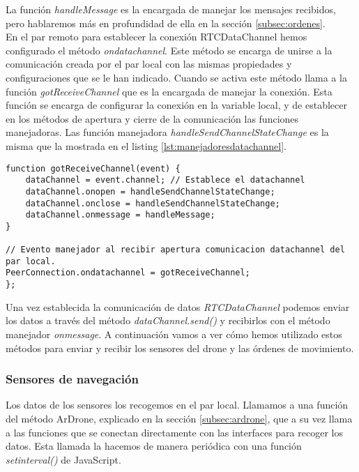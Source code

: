La función \emph{handleMessage} es la encargada de manejar los mensajes recibidos, pero hablaremos más en profundidad de ella en la sección \ref{subsec:ordenes}.\\

En el par remoto para establecer la conexión RTCDataChannel hemos configurado el método \emph{ondatachannel}. Este método se encarga de unirse a la comunicación creada por el par local con las mismas propiedades y configuraciones que se le han indicado. Cuando se activa este método llama a la función \emph{gotReceiveChannel} que es la encargada de manejar  la conexión. Esta función se encarga de configurar la conexión en la variable local, y de establecer en los métodos de apertura y cierre de la comunicación las funciones manejadoras. Las función manejadora \emph{handleSendChannelStateChange} es la misma que la mostrada en el listing \ref{lst:manejadoresdatachannel}.\\

\begin{lstlisting}[caption={Establecimiento de RTCDataChannel en el par remoto.}]
function gotReceiveChannel(event) {
	dataChannel = event.channel; // Establece el datachannel
	dataChannel.onopen = handleSendChannelStateChange;
	dataChannel.onclose = handleSendChannelStateChange;
	dataChannel.onmessage = handleMessage;
}

// Evento manejador al recibir apertura comunicacion datachannel del par local.
PeerConnection.ondatachannel = gotReceiveChannel;
};\end{lstlisting}

Una vez establecida la comunicación de datos \emph{RTCDataChannel} podemos enviar los datos a través del método \emph{dataChannel.send()} y recibirlos con el método manejador \emph{onmessage}. A continuación vamos a ver cómo hemos utilizado estos métodos para enviar y recibir los sensores del drone y las órdenes de movimiento.\\


\subsubsection{Sensores de navegación}

Los datos de los sensores los recogemos en el par local. Llamamos a una función del método ArDrone, explicado en la sección \ref{subsec:ardrone}, que a su vez llama a las funciones que se conectan directamente con las interfaces para recoger los datos. Esta llamada la hacemos de manera periódica con una función \emph{setinterval()} de JavaScript.\\

